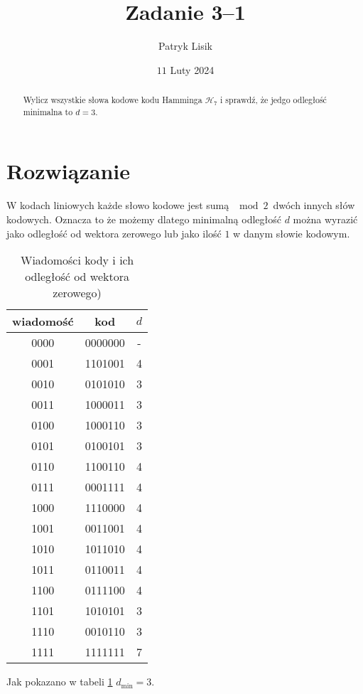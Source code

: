 \documentclass[12pt]{article}
\title{Zadanie 3--1}
\author{Patryk Lisik}
\date{\(11\) Luty  2024}
\begin{document}
\maketitle
\renewcommand{\abstractname}{Treść}

\begin{abstract}
    Wylicz wszystkie słowa kodowe kodu Hamminga $\mathcal{H}_7$ i sprawdź, że jedgo odległość minimalna to $ d=3 $.
\end{abstract}


\section*{Rozwiązanie}
W kodach liniowych każde słowo kodowe jest sumą $\mod 2$ dwóch innych słów kodowych. 
Oznacza to że możemy dlatego minimalną odległość $d$ można wyrazić jako odległość od wektora zerowego lub 
jako ilość $1$ w danym słowie kodowym.

\begin{table}[h]
    \centering
    \begin{tabular}{ccc}
        wiadomość & kod       & $d$ \\ \hline
        0000      & 0000000   &  - \\ 
        0001      & 1101001   &  4 \\ 
        0010      & 0101010   &  3 \\ 
        0011      & 1000011   &  3 \\ 
        0100      & 1000110   &  3 \\ 
        0101      & 0100101   &  3 \\ 
        0110      & 1100110   &  4 \\ 
        0111      & 0001111   &  4 \\ 
        1000      & 1110000   &  4 \\ 
        1001      & 0011001   &  4 \\ 
        1010      & 1011010   &  4 \\ 
        1011      & 0110011   &  4 \\ 
        1100      & 0111100   &  4 \\ 
        1101      & 1010101   &  3 \\ 
        1110      & 0010110   &  3 \\ 
        1111      & 1111111   &  7 \\ 
    \end{tabular}
    \caption{Wiadomości kody i ich odległość od wektora zerowego)}
    \label{tab}
\end{table}

Jak pokazano w tabeli \ref{tab} $d_{\min}=3$.
\end{document}
